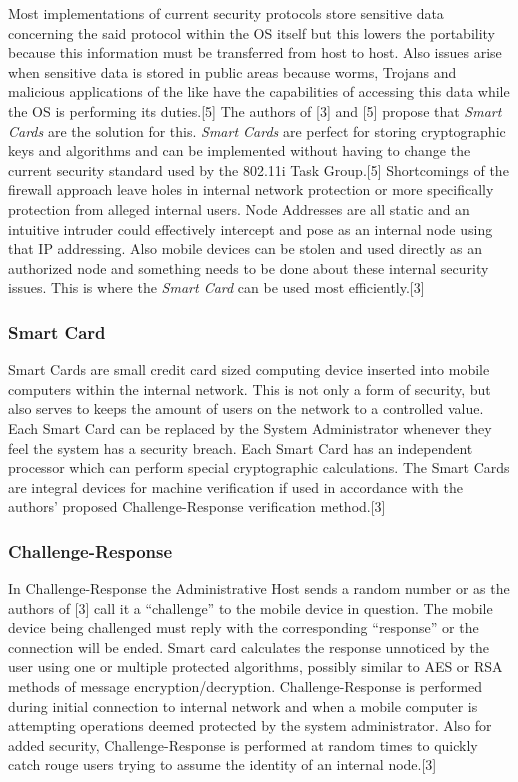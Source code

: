 \documentclass[11pt,onecolumn,cspaper,compsoc]{IEEEtran}
\begin{document}
Most implementations of current security protocols store sensitive data concerning the said protocol within the OS itself but this lowers the portability because this information must be 
transferred from host to host. Also issues arise when sensitive data is stored in public areas because worms, Trojans and malicious applications of the like have the capabilities of accessing 
this data while the OS is performing its duties.[5] The authors of [3] and [5] propose that \textit{Smart Cards} are the solution for this. \textit{Smart Cards} are perfect for storing cryptographic keys and 
algorithms and can be implemented without having to change the current security standard used by the 802.11i Task Group.[5] Shortcomings of the firewall approach leave holes in internal network 
protection or more specifically protection from alleged internal users. Node Addresses are all static and an intuitive intruder could effectively intercept and pose as an internal node using 
that IP addressing. Also mobile devices can be stolen and used directly as an authorized node and something needs to be done about these internal security issues. This is where the 
\textit{Smart Card} can be used most efficiently.[3]

\subsubsection*{Smart Card}

Smart Cards are small credit card sized computing device inserted into mobile computers within the internal network. This is not only a form of security, but also serves to keeps the amount of 
users on the network to a controlled value. Each Smart Card can be replaced by the System Administrator whenever they feel the system has a security breach. Each Smart Card has an independent 
processor which can perform special cryptographic calculations. The Smart Cards are integral devices for machine verification if used in accordance with the authors’ proposed Challenge-Response 
verification method.[3]

\subsubsection*{Challenge-Response}
In Challenge-Response the Administrative Host sends a random number or as the authors of [3] call it a “challenge” to the mobile device in question. The mobile device being challenged must 
reply with the corresponding “response” or the connection will be ended. Smart card calculates the response unnoticed by the user using one or multiple protected algorithms, possibly similar to 
AES or RSA methods of message encryption/decryption. Challenge-Response is performed during initial connection to internal network and when a mobile computer is attempting operations deemed 
protected by the system administrator. Also for added security, Challenge-Response is performed at random times to quickly catch rouge users trying to assume the identity of an internal node.[3]
\end{document}

